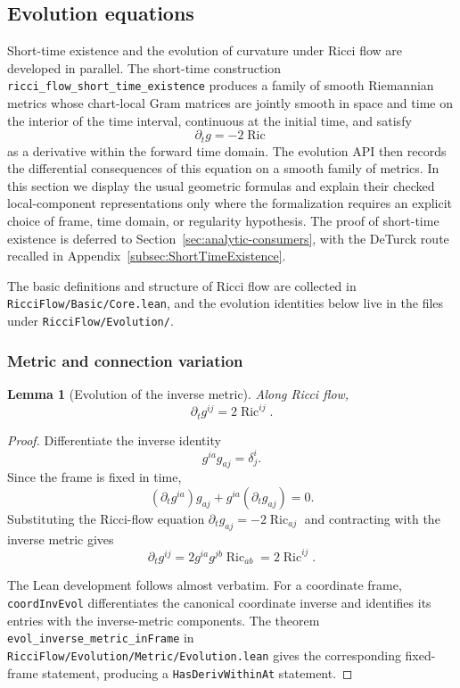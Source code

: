 \documentclass[11pt]{article}
\theoremstyle{plain}
\newtheorem{lemma}[theorem]{Lemma}
\theoremstyle{definition}
\theoremstyle{remark}
\newcommand{\Ric}{\operatorname{Ric}}
\newcommand{\leanref}[1]{\nolinkurl{#1}}
\newcommand{\leanfile}[1]{\nolinkurl{#1}}
\newcommand{\rffile}[1]{\leanfile{#1}}
\newcommand{\rfdir}[1]{\leanfile{#1/}}
\begin{document}
\subsection{Evolution equations}

Short-time existence and the evolution of curvature under Ricci flow are
developed in parallel.  The short-time construction
\leanref{ricci_flow_short_time_existence} produces a family of smooth
Riemannian metrics whose chart-local Gram matrices are jointly smooth in space
and time on the interior of the time interval, continuous at the initial time,
and satisfy
\[
  \partial_t g=-2\Ric
\]
as a derivative within the forward time domain.  The evolution API then records
the differential consequences of this equation on a smooth family of metrics.
In this section we display the usual geometric formulas and explain their
checked local-component representations only where the formalization requires an
explicit choice of frame, time domain, or regularity hypothesis.  The proof of
short-time existence is deferred to Section~\ref{sec:analytic-consumers}, with
the DeTurck route recalled in Appendix~\ref{subsec:ShortTimeExistence}.

The basic definitions and structure of Ricci flow are collected in
\rffile{RicciFlow/Basic/Core.lean}, and the evolution identities below live in
the files under \rfdir{RicciFlow/Evolution}.

\subsubsection{Metric and connection variation}

\begin{lemma}[Evolution of the inverse metric]
\label{lem:evol-inverse-metric}
Along Ricci flow,
\[
  \partial_t g^{ij}=2\Ric^{ij}.
\]
\end{lemma}

\begin{proof}
Differentiate the inverse identity
\[
  g^{ia}g_{aj}=\delta^i_j.
\]
Since the frame is fixed in time,
\[
  (\partial_t g^{ia})g_{aj}
  +g^{ia}(\partial_t g_{aj})=0.
\]
Substituting the Ricci-flow equation \(\partial_tg_{aj}=-2\Ric_{aj}\) and
contracting with the inverse metric gives
\[
  \partial_tg^{ij}
  =
  2g^{ia}g^{jb}\Ric_{ab}
  =
  2\Ric^{ij}.
\]

The Lean development follows almost verbatim.  For a coordinate frame,
\leanref{coordInvEvol} differentiates the canonical coordinate inverse and
identifies its entries with the inverse-metric components.  The theorem
\leanref{evol_inverse_metric_inFrame} in
\rffile{RicciFlow/Evolution/Metric/Evolution.lean} gives the corresponding
fixed-frame statement, producing a \texttt{HasDerivWithinAt} statement.
\end{proof}
\end{document}
